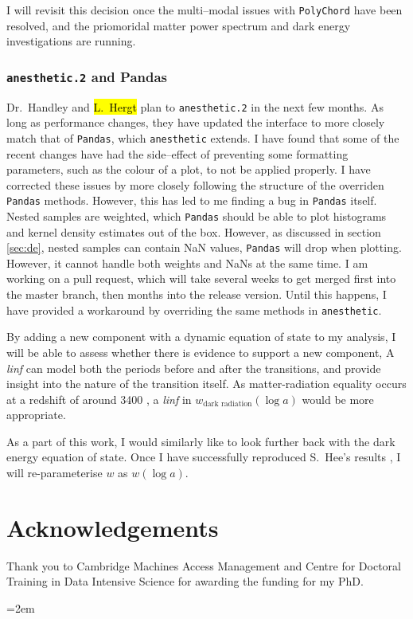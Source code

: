 \documentclass{article}
\begin{document}
I will revisit this decision once the multi--modal issues with \texttt{PolyChord} have been resolved, and the priomoridal matter power spectrum and dark energy investigations are running.

\subsubsection{\texttt{anesthetic.2} and {Pandas}}

Dr.~Handley and \hl{L.~Hergt} plan to \texttt{anesthetic.2} in the next few months. As long as performance changes, they have updated the interface to more closely match that of \texttt{Pandas}, which \texttt{anesthetic} extends. I have found that some of the recent changes have had the side--effect of preventing some formatting parameters, such as the colour of a plot, to not be applied properly. I have corrected these issues by more closely following the structure of the overriden \texttt{Pandas} methods. However, this has led to me finding a bug in \texttt{Pandas} itself. Nested samples are weighted, which \texttt{Pandas} should be able to plot histograms and kernel density estimates out of the box. However, as discussed in section \ref{sec:de}, nested samples can contain NaN values, \texttt{Pandas} will drop when plotting. However, it cannot handle both weights and NaNs at the same time. I am working on a pull request, which will take several weeks to get merged first into the master branch, then months into the release version. Until this happens, I have provided a workaround by overriding the same methods in \texttt{anesthetic}.

By adding a new component with a dynamic equation of state to my analysis, I will be able to assess whether there is evidence to support a new component, 
A \textit{linf} can model both the periods before and after the transitions, and provide insight into the nature of the transition itself. As matter-radiation equality occurs at a redshift of around 3400 \cite{planck_6}, a \textit{linf} in $w_\textrm{dark radiation}(\log{a})$ would be more appropriate. 


As a part of this work, I would similarly like to look further back with the dark energy equation of state. Once I have successfully reproduced S.~Hee's results \cite{Sonke}, I will re-parameterise $w$ as $w(\log{a})$.

\section{Acknowledgements}

Thank you to Cambridge Machines Access Management and Centre for Doctoral Training in Data Intensive Science for awarding the funding for my PhD.

\newpage
\emergencystretch=2em
\printbibliography
\end{document}
